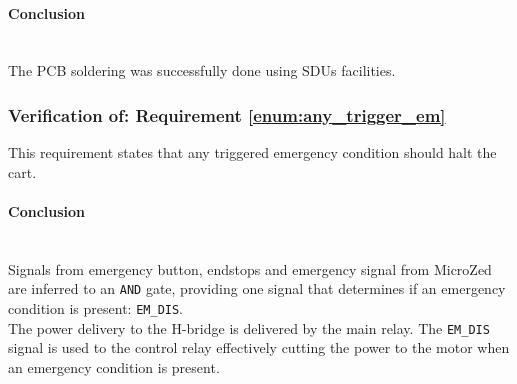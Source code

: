\paragraph{Conclusion}~\\
The PCB soldering was successfully done using SDUs facilities.

\subsubsection{Verification of: Requirement \ref{enum:any_trigger_em}} %
\label{ssub:requirement_enum:any_trigger_em}
This requirement states that any triggered emergency condition should halt the cart.

\paragraph{Conclusion}~\\
Signals from emergency button, endstops and emergency signal from MicroZed are inferred to an \texttt{AND} gate, providing one signal that determines if an emergency condition is present: \texttt{EM\_DIS}.
\\
The power delivery to the H-bridge is delivered by the main relay.
The \texttt{EM\_DIS} signal is used to the control relay effectively cutting the power to the motor when an emergency condition is present.
